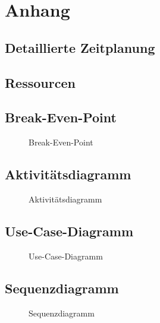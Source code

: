 \section{Anhang}
\subsection{Detaillierte Zeitplanung}
\label{app:Zeitplanung}
\clearpage

\subsection{Ressourcen}
\label{app:Ressourcen}

\clearpage

\subsection{Break-Even-Point}
\label{app:BreakEvenPoint}
\begin{figure}[!htb]
    \centering
    \caption{Break-Even-Point}
\end{figure}


\clearpage

\subsection{Aktivitätsdiagramm}
\label{app:Aktivitaet}
\begin{figure}[!htb]
    \centering
    \caption{Aktivitätsdiagramm}
\end{figure}
\clearpage

\subsection{Use-Case-Diagramm}
\label{app:UseCase}
\begin{figure}[!htb]
\centering
{}
\caption{Use-Case-Diagramm}
\end{figure}

\subsection{Sequenzdiagramm}
\label{app:Sequenz}
\begin{figure}[!htb]
    \centering
    \caption{Sequenzdiagramm}
\end{figure}

